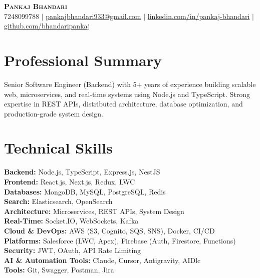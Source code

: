 \documentclass[letterpaper,11pt]{article}
\begin{document}
\begin{center}
    \textbf{\Huge \scshape Pankaj Bhandari} \\ \vspace{1pt}
    \small 7248099788 $|$ 
    \href{mailto:pankajbhandari933@gmail.com}{pankajbhandari933@gmail.com} $|$ 
    \href{https://linkedin.com/in/pankaj-bhandari-918504223}{linkedin.com/in/pankaj-bhandari} $|$
    \href{https://github.com/bhandaripankaj}{github.com/bhandaripankaj}
\end{center}

\section{Professional Summary}
\begin{itemize}[leftmargin=0.15in, label={}]
\small{\item{
Senior Software Engineer (Backend) with 5+ years of experience building scalable web, microservices, and real-time systems using Node.js and TypeScript. Strong expertise in REST APIs, distributed architecture, database optimization, and production-grade system design.
}}
\end{itemize}

\section{Technical Skills}
 \begin{itemize}[leftmargin=0.15in, label={}]
    \small{\item{
     \textbf{Backend:} Node.js, TypeScript, Express.js, NestJS \\
     \textbf{Frontend:} React.js, Next.js, Redux, LWC \\
     \textbf{Databases:} MongoDB, MySQL, PostgreSQL, Redis \\
     \textbf{Search:} Elasticsearch, OpenSearch \\
     \textbf{Architecture:} Microservices, REST APIs, System Design \\
     \textbf{Real-Time:} Socket.IO, WebSockets, Kafka \\
     \textbf{Cloud \& DevOps:} AWS (S3, Cognito, SQS, SNS), Docker, CI/CD \\
     \textbf{Platforms:} Salesforce (LWC, Apex), Firebase (Auth, Firestore, Functions) \\
     \textbf{Security:} JWT, OAuth, API Rate Limiting \\
     \textbf{AI \& Automation Tools:} Claude, Cursor, Antigravity, AIDlc \\
     \textbf{Tools:} Git, Swagger, Postman, Jira
    }}
 \end{itemize}
\end{document}
